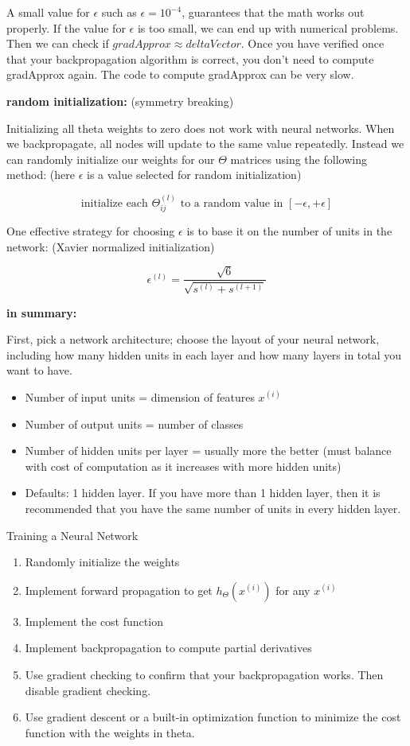 \documentclass{article}
\begin{document}
\noindent A small value for \(\epsilon\) such as \(\epsilon = 10^{-4}\), guarantees that the math works out properly. If the value for \(\epsilon\) is too small, we can end up with numerical problems. Then we can check if \(gradApprox \approx deltaVector\). Once you have verified once that your backpropagation algorithm is correct, you don't need to compute gradApprox again. The code to compute gradApprox can be very slow.
 
\bigskip

\noindent \textbf{random initialization:} (symmetry breaking)

\noindent Initializing all theta weights to zero does not work with neural networks. When we backpropagate, all nodes will update to the same value repeatedly. Instead we can randomly initialize our weights for our \(\Theta\) matrices using the following method: (here \(\epsilon\) is a value selected for random initialization)

\[\text{initialize each } \Theta_{ij}^{(l)} \text{ to a random value in } [-\epsilon, +\epsilon]\]

\noindent One effective strategy for choosing \(\epsilon\) is to base it on the number of units in the network: (Xavier normalized initialization)

\[\epsilon^{(l)} = \frac{\sqrt{6}}{\sqrt{s^{(l)} + s^{(l + 1)}}}\]

\noindent \textbf{in summary:}

\noindent First, pick a network architecture; choose the layout of your neural network, including how many hidden units in each layer and how many layers in total you want to have.

\begin{itemize}
  \item Number of input units = dimension of features \(x^{(i)}\)
  \item Number of output units = number of classes
  \item Number of hidden units per layer = usually more the better (must balance with cost of computation as it increases with more hidden units)
  \item Defaults: 1 hidden layer. If you have more than 1 hidden layer, then it is recommended that you have the same number of units in every hidden layer.
\end{itemize}

\noindent Training a Neural Network

\begin{enumerate}
  \item Randomly initialize the weights
  \item Implement forward propagation to get \(h_\Theta(x^{(i)})\) for any \(x^{(i)}\)
  \item Implement the cost function
  \item Implement backpropagation to compute partial derivatives
  \item Use gradient checking to confirm that your backpropagation works. Then disable gradient checking.
  \item Use gradient descent or a built-in optimization function to minimize the cost function with the weights in theta.
\end{enumerate}
\end{document}
